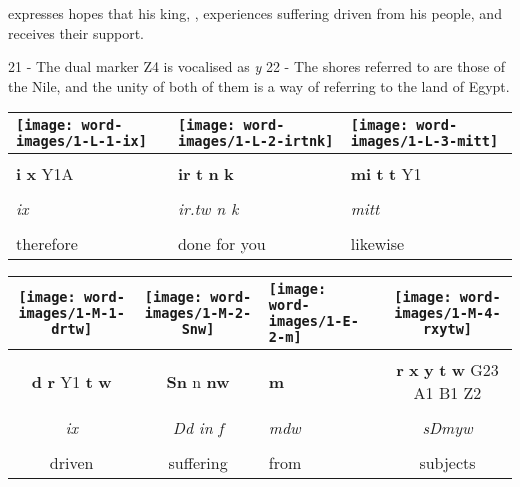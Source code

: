 \vspace*{\fill}

\pagebreak

\vspace*{\fill}

 expresses hopes that his king, , experiences suffering driven from his people, and receives their support.

\vspace*{\fill}

21 - The dual marker Z4 is vocalised as \textit{y}
22 - The shores referred to are those of the Nile, and the unity of both of them is a way of referring to the land of Egypt.

\pagebreak


\vspace*{\fill}

\begin{tabularx}{\linewidth}{YYY}
	\texttt{[image: word-images/1-L-1-ix]} &
	\texttt{[image: word-images/1-L-2-irtnk]} &
	\texttt{[image: word-images/1-L-3-mitt]} \\
	\hline \\ 
	\textbf{i} \textbf{x} Y1A &
	\textbf{ir} \textbf{t} \textbf{n} \textbf{k} &
	\textbf{mi} \textbf{t} \textbf{t} Y1 \\
	\hline \\ 
	\textit{ix} & \textit{ir.tw n k} & \textit{mitt} \\
	\hline \\ 
	therefore & done for you & likewise
\end{tabularx}

\vspace{7.5mm}

\begin{tabularx}{\linewidth}{ccYc}
	\texttt{[image: word-images/1-M-1-drtw]} &
	\texttt{[image: word-images/1-M-2-Snw]} &
	\texttt{[image: word-images/1-E-2-m]} &
	\texttt{[image: word-images/1-M-4-rxytw]} \\
	\hline \\ 
	\textbf{d} \textbf{r} Y1 \textbf{t} \textbf{w} &
	\textbf{Sn} n \textbf{nw} &
	\textbf{m} &
	\textbf{r} \textbf{x} \textbf{y} \textbf{t} \textbf{w} G23 A1 B1 Z2 \\
	\hline \\ 
	\textit{ix} & \hspace*{-4mm} \textit{Dd in f} & \textit{mdw} & \textit{sDmyw} \\
	\hline \\ 
	driven & suffering & from & subjects
\end{tabularx}

